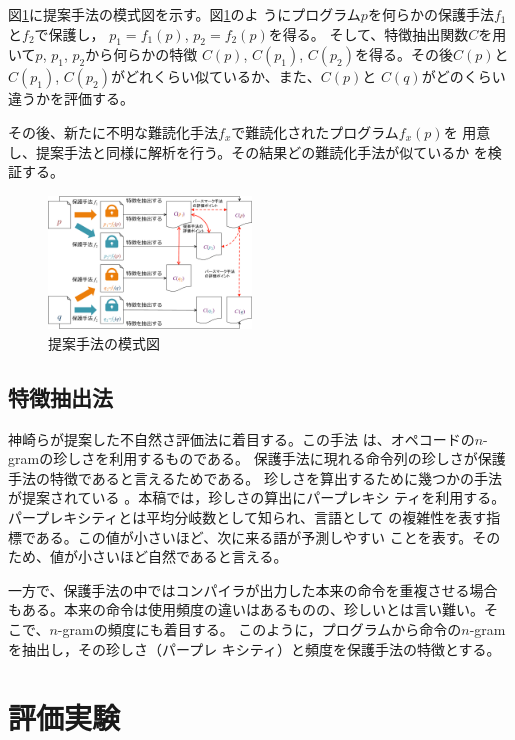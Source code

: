 \documentclass[a4j,fleqn,10pt]{jarticle}
\newcommand{\birth}[1]{$C(#1)$}
\begin{document}
図\ref{fig:overview}に提案手法の模式図を示す。図\ref{fig:overview}のよ
うにプログラム$p$を何らかの保護手法$f_1$と$f_2$で保護し，
$p_1=f_1(p)$, $p_2=f_2(p)$を得る。
%
そして、特徴抽出関数$C$を用いて$p$, $p_1$, $p_2$から何らかの特徴
\birth{p}, \birth{p_1}, \birth{p_2}を得る。その後\birth{p}と
\birth{p_1}, \birth{p_2}がどれくらい似ているか、また、\birth{p}と
\birth{q}がどのくらい違うかを評価する。

その後、新たに不明な難読化手法$f_x$で難読化されたプログラム$f_x(p)$を
用意し、提案手法と同様に解析を行う。その結果どの難読化手法が似ているか
を検証する。

\begin{figure}[b]
  \includegraphics[width=0.48\textwidth]{overview}
  \caption{提案手法の模式図}\label{fig:overview}
\end{figure}

\subsection{特徴抽出法}\label{sect:method}

神崎らが提案した不自然さ評価法に着目する\cite{kanzaki14ipsj}。この手法
は、オペコードの$n$-gramの珍しさを利用するものである。
%
保護手法に現れる命令列の珍しさが保護手法の特徴であると言えるためである。
珍しさを算出するために幾つかの手法が提案されている
\cite{kanzaki14ipsj,gekka14scis}。本稿では，珍しさの算出にパープレキシ
ティを利用する。パープレキシティとは平均分岐数として知られ、言語として
の複雑性を表す指標である。この値が小さいほど、次に来る語が予測しやすい
ことを表す。そのため、値が小さいほど自然であると言える。

一方で、保護手法の中ではコンパイラが出力した本来の命令を重複させる場合
もある。本来の命令は使用頻度の違いはあるものの、珍しいとは言い難い。そ
こで、$n$-gramの頻度にも着目する。
%
このように，プログラムから命令の$n$-gramを抽出し，その珍しさ（パープレ
  キシティ）と頻度を保護手法の特徴とする。

\section{評価実験}\label{sect:experiments}
\end{document}
